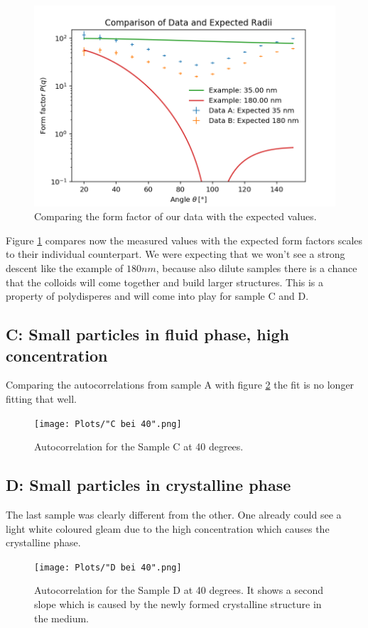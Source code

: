 \documentclass[]{article}
\begin{document}
\begin{figure}[!htbp]
\centering
\includegraphics[width=0.8\linewidth]{Plots/Comparison.png}
\caption{Comparing the form factor of our data with the expected values.}
\label{AB comparison}
\end{figure}

Figure \ref{AB comparison} compares now the measured values with the expected form factors scales to their individual counterpart.
We were expecting that we won't see a strong descent like the example of $180nm$, because also dilute samples there is a chance that the colloids will come together and build larger structures. This is a property of polydisperes and will come into play for sample C and D. 


\subsection{C: Small particles in fluid phase, high concentration}
Comparing the autocorrelations from sample A with figure \ref{C} the fit is no longer fitting that well.

\begin{figure}[!htbp]
\centering
\texttt{[image: Plots/"C bei 40".png]}
\caption{Autocorrelation for the Sample C at 40 degrees.}
\label{C}
\end{figure}


\subsection{D: Small particles in crystalline phase}
The last sample was clearly different from the other. One already could see a light white coloured gleam due to the high concentration which causes the crystalline phase. 

\begin{figure}[!htbp]
\centering
\texttt{[image: Plots/"D bei 40".png]}
\caption{Autocorrelation for the Sample D at 40 degrees. It shows a second slope which is caused by the newly formed crystalline structure in the medium.}
\label{D}
\end{figure}
\end{document}
